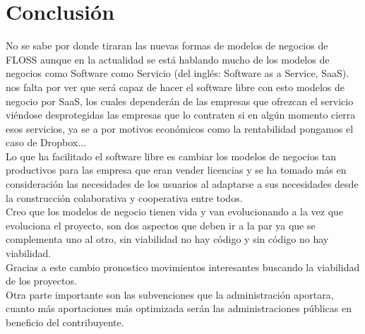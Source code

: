 \documentclass[12pt]{article} %
\begin{document}
\section{Conclusión}  

No se sabe por donde tiraran las nuevas formas de modelos de negocios de FLOSS aunque en la actualidad se está hablando mucho de los modelos de negocios como Software como Servicio (del inglés: Software as a Service, SaaS). nos falta por ver que será capaz de hacer el software libre con esto modelos de negocio por SaaS, los cuales dependerán de las empresas que ofrezcan el servicio viéndose desprotegidas las empresas que lo contraten si en algún momento cierra esos servicios, ya se a por motivos económicos como la rentabilidad pongamos el caso de Dropbox...\\Lo que ha facilitado el software libre es cambiar los modelos de negocios tan productivos para las empresa que eran vender licencias y se ha tomado más en consideración las necesidades de los usuarios al adaptarse a sus necesidades desde la construcción colaborativa y cooperativa entre todos.\\Creo que los modelos de negocio tienen vida y van evolucionando a la vez que evoluciona el proyecto, son dos aspectos que deben ir a la par ya que se complementa uno al otro, sin viabilidad no hay código y sin código no hay viabilidad.\\Gracias a este cambio pronostico movimientos interesantes buscando la viabilidad de los proyectos.\\Otra parte importante son las subvenciones que la administración aportara, cuanto más aportaciones más optimizada serán las administraciones públicas en beneficio del contribuyente.
 
\end{document}
